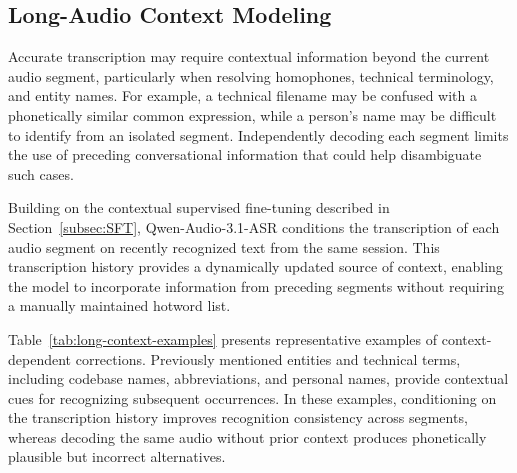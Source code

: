 \documentclass{article}
\begin{document}
\subsection{Long-Audio Context Modeling}
\label{subsec:long-audio-context}

Accurate transcription may require contextual information beyond the current audio segment, particularly when resolving homophones, technical terminology, and entity names. For example, a technical filename may be confused with a phonetically similar common expression, while a person's name may be difficult to identify from an isolated segment. Independently decoding each segment limits the use of preceding conversational information that could help disambiguate such cases.

Building on the contextual supervised fine-tuning described in Section~\ref{subsec:SFT}, Qwen-Audio-3.1-ASR conditions the transcription of each audio segment on recently recognized text from the same session. This transcription history provides a dynamically updated source of context, enabling the model to incorporate information from preceding segments without requiring a manually maintained hotword list.

%
Table~\ref{tab:long-context-examples} presents representative examples of context-dependent corrections. Previously mentioned entities and technical terms, including codebase names, abbreviations, and personal names, provide contextual cues for recognizing subsequent occurrences. In these examples, conditioning on the transcription history improves recognition consistency across segments, whereas decoding the same audio without prior context produces phonetically plausible but incorrect alternatives.

%
%
%
%
%
%
%
%
%
%
%
%
%
%
%
%
%
%
%
\end{document}
